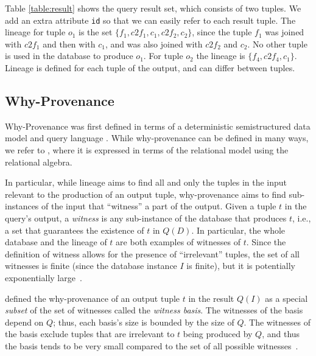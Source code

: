 Table \ref{table:result} shows the query result set, which consists of two tuples. We add an extra  attribute \texttt{id} so that we can easily refer to each result tuple.  
The lineage for tuple $o_1$ is the set $\{f_1, c2f_1, c_1, c2f_2, c_2\}$, since the tuple $f_1$ was joined with $c2f_1$ and then with $c_1$, and was also joined with $c2f_2$ and $c_2$. No other tuple is used in the database to produce $o_1$.
For tuple $o_2$ the lineage is $\{ f_4, c2f_4, c_1\}$.
Lineage is defined for each tuple of the output, and can differ between tuples.

\subsection{Why-Provenance}
Why-Provenance was first defined in terms of a deterministic semistructured data model and query language \citep{WhyProvBuneman}. 
While why-provenance can be defined in many ways, we refer to \citep{CheneyProvSurvey}, where it is expressed in terms of the relational model using the relational algebra.

In particular, while lineage aims to find all and only the tuples in the input relevant to the production of an output tuple, why-provenance aims to find sub-instances of the input that ``witness'' a part of the output. 
Given a tuple $t$ in the query's output, a \emph{witness} is any sub-instance of the database that produces $t$, i.e., a set that guarantees the existence of $t$ in $Q(D)$.
In particular, the whole database and the lineage of $t$ are both examples of witnesses of $t$.
Since the definition of witness allows for the presence of ``irrelevant'' tuples, the set of all witnesses is finite (since the database instance $I$ is finite), but it is potentially exponentially large~\citep{CheneyProvSurvey}.

\citet{WhyProvBuneman} defined the why-provenance of an output tuple $t$ in the result $Q(I)$ as a special \emph{subset} of the set of witnesses called the \emph{witness basis}.
The witnesses of the basis depend on $Q$; thus, each basis's size is bounded by the size of $ Q $. The witnesses of the basis exclude tuples that are irrelevant to $t$ being produced by $Q$, and thus the basis tends to be very small compared to the set of all possible witnesses~\citep{CheneyProvSurvey}.


